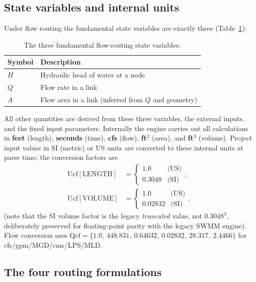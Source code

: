 \documentclass[11pt,a4paper]{article}
\begin{document}
\subsection{State variables and internal units}

Under flow routing the fundamental state variables are exactly three
(Table~\ref{tab:statevars}):

\begin{table}[H]
\centering
\begin{tabular}{ll}
\toprule
\textbf{Symbol} & \textbf{Description} \\
\midrule
$H$  & Hydraulic head of water at a node \\
$Q$  & Flow rate in a link \\
$A$  & Flow area in a link (inferred from $Q$ and geometry) \\
\bottomrule
\end{tabular}
\caption{The three fundamental flow-routing state variables.}
\label{tab:statevars}
\end{table}

All other quantities are derived from these three variables, the external
inputs, and the fixed input parameters. Internally the engine carries out all
calculations in \textbf{feet} (length), \textbf{seconds} (time), \textbf{cfs}
(flow), \textbf{ft$^2$} (area), and \textbf{ft$^3$} (volume). Project input
values in SI (metric) or US units are converted to these internal units at
parse time; the conversion factors are
\begin{align}
  \mathrm{Ucf}[\mathrm{LENGTH}] &=
    \begin{cases} 1.0 & \text{(US)} \\ 0.3048 & \text{(SI)} \end{cases}, \\
  \mathrm{Ucf}[\mathrm{VOLUME}] &=
    \begin{cases} 1.0 & \text{(US)} \\ 0.02832 & \text{(SI)} \end{cases},
\end{align}
(note that the SI volume factor is the legacy \emph{truncated} value, not
$0.3048^3$, deliberately preserved for floating-point parity with the legacy
SWMM engine). Flow conversion uses $\mathrm{Qcf} = \{1.0,\ 448.831,\ 0.64632,\
0.02832,\ 28.317,\ 2.4466\}$ for cfs/gpm/MGD/cms/LPS/MLD.

\subsection{The four routing formulations}
\end{document}
